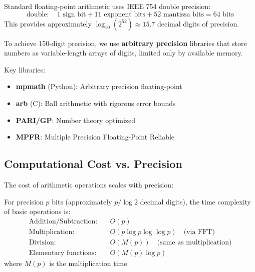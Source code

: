 Standard floating-point arithmetic uses IEEE 754 double precision:
\begin{equation}
\text{double}: \quad 1 \text{ sign bit} + 11 \text{ exponent bits} + 52 \text{ mantissa bits} = 64 \text{ bits}
\end{equation}
This provides approximately $\log_{10}(2^{52}) \approx 15.7$ decimal digits of precision.

\begin{keyidea}
To achieve 150-digit precision, we use \textbf{arbitrary precision} libraries that store numbers as variable-length arrays of digits, limited only by available memory.

Key libraries:
\begin{itemize}
\item \textbf{mpmath} (Python): Arbitrary precision floating-point
\item \textbf{arb} (C): Ball arithmetic with rigorous error bounds
\item \textbf{PARI/GP}: Number theory optimized
\item \textbf{MPFR}: Multiple Precision Floating-Point Reliable
\end{itemize}
\end{keyidea}

\subsection{Computational Cost vs. Precision}

The cost of arithmetic operations scales with precision:

\begin{thm}\label{thm:arith-complexity}
For precision $p$ bits (approximately $p/\log 2$ decimal digits), the time complexity of basic operations is:
\begin{align}
\text{Addition/Subtraction:} &\quad O(p) \\
\text{Multiplication:} &\quad O(p \log p \log\log p) \quad \text{(via FFT)} \\
\text{Division:} &\quad O(M(p)) \quad \text{(same as multiplication)} \\
\text{Elementary functions:} &\quad O(M(p) \log p)
\end{align}
where $M(p)$ is the multiplication time.
\end{thm}


